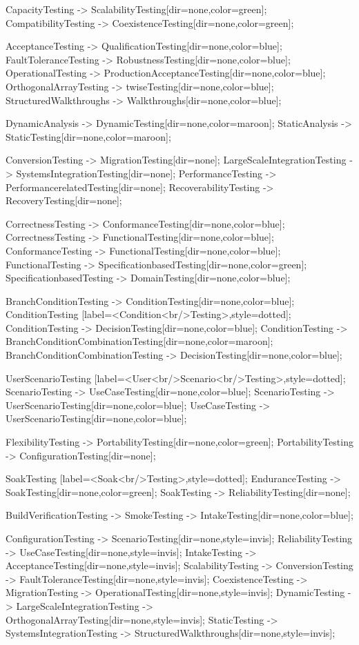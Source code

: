 \documentclass{article}
\begin{document}
{CapacityTesting -> ScalabilityTesting[dir=none,color=green];
CompatibilityTesting -> CoexistenceTesting[dir=none,color=green];

AcceptanceTesting -> QualificationTesting[dir=none,color=blue];
FaultToleranceTesting -> RobustnessTesting[dir=none,color=blue];
OperationalTesting -> ProductionAcceptanceTesting[dir=none,color=blue];
OrthogonalArrayTesting -> twiseTesting[dir=none,color=blue];
StructuredWalkthroughs -> Walkthroughs[dir=none,color=blue];

DynamicAnalysis -> DynamicTesting[dir=none,color=maroon];
StaticAnalysis -> StaticTesting[dir=none,color=maroon];

ConversionTesting -> MigrationTesting[dir=none];
LargeScaleIntegrationTesting -> SystemsIntegrationTesting[dir=none];
PerformanceTesting -> PerformancerelatedTesting[dir=none];
RecoverabilityTesting -> RecoveryTesting[dir=none];

CorrectnessTesting -> ConformanceTesting[dir=none,color=blue];
CorrectnessTesting -> FunctionalTesting[dir=none,color=blue];
ConformanceTesting -> FunctionalTesting[dir=none,color=blue];
FunctionalTesting -> SpecificationbasedTesting[dir=none,color=green];
SpecificationbasedTesting -> DomainTesting[dir=none,color=blue];

BranchConditionTesting -> ConditionTesting[dir=none,color=blue];
ConditionTesting [label=<Condition<br/>Testing>,style=dotted];
ConditionTesting -> DecisionTesting[dir=none,color=blue];
ConditionTesting -> BranchConditionCombinationTesting[dir=none,color=maroon];
BranchConditionCombinationTesting -> DecisionTesting[dir=none,color=blue];

UserScenarioTesting [label=<User<br/>Scenario<br/>Testing>,style=dotted];
ScenarioTesting -> UseCaseTesting[dir=none,color=blue];
ScenarioTesting -> UserScenarioTesting[dir=none,color=blue];
UseCaseTesting -> UserScenarioTesting[dir=none,color=blue];

FlexibilityTesting -> PortabilityTesting[dir=none,color=green];
PortabilityTesting -> ConfigurationTesting[dir=none];

SoakTesting [label=<Soak<br/>Testing>,style=dotted];
EnduranceTesting -> SoakTesting[dir=none,color=green];
SoakTesting -> ReliabilityTesting[dir=none];

BuildVerificationTesting -> SmokeTesting -> IntakeTesting[dir=none,color=blue];

ConfigurationTesting -> ScenarioTesting[dir=none,style=invis];
ReliabilityTesting -> UseCaseTesting[dir=none,style=invis];
IntakeTesting -> AcceptanceTesting[dir=none,style=invis];
ScalabilityTesting -> ConversionTesting -> FaultToleranceTesting[dir=none,style=invis];
CoexistenceTesting -> MigrationTesting -> OperationalTesting[dir=none,style=invis];
DynamicTesting -> LargeScaleIntegrationTesting -> OrthogonalArrayTesting[dir=none,style=invis];
StaticTesting -> SystemsIntegrationTesting -> StructuredWalkthroughs[dir=none,style=invis];

}
\end{document}

